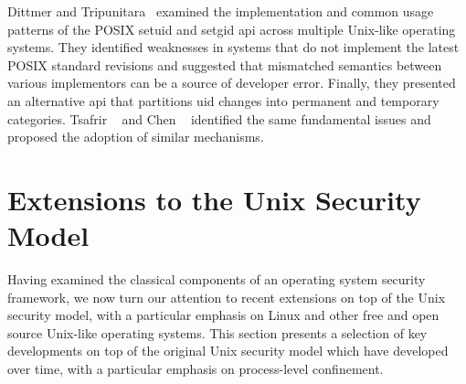 Dittmer and Tripunitara~\cite{dittmer2014_setuid} examined the implementation and common
usage patterns of the POSIX setuid and setgid \gls{api} across multiple Unix-like operating
systems. They identified weaknesses in systems that do not implement the latest POSIX
standard revisions and suggested that mismatched semantics between various implementors
can be a source of developer error. Finally, they presented an alternative \gls{api} that
partitions \gls{uid} changes into permanent and temporary categories. Tsafrir
\etal~\cite{tsafrir2008_setuid} and Chen \etal~\cite{chen2002_setuid} identified the same
fundamental issues and proposed the adoption of similar mechanisms.


%



\section{Extensions to the Unix Security Model}%
\label{s:security-extensions}

Having examined the classical components of an operating system security framework, we now
turn our attention to recent extensions on top of the Unix security model, with
a particular emphasis on Linux and other free and open source Unix-like operating systems.
This section presents a selection of key developments on top of the original Unix security
model which have developed over time, with a particular emphasis on process-level
confinement.


